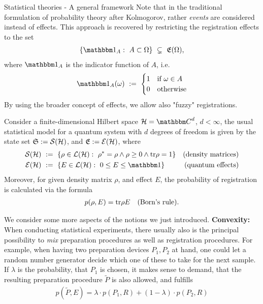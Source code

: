 \begin{section}{Statistical theories - A general framework}
Note that in the traditional formulation of probability theory after Kolmogorov, rather \emph{events} are considered instead of effects. This approach is recovered by restricting the registration effects to the set
\begin{align*}
\left\{\bbmeins_A: \ A \subset \Omega  \right\} \ \subsetneq \ \fE(\Omega),
\end{align*}
where $\bbmeins_A$ is the indicator function of $A$, i.e. 
\begin{align*}
  \bbmeins_A(\omega) \ := \ 
  \begin{cases}
	  1 	&\text{if} \ \omega \in A \\
	  0  	&\text{otherwise}
  \end{cases}
\end{align*}	
By using the broader concept of effects, we allow also "fuzzy" registrations. 
\begin{example}
Consider a finite-dimensional Hilbert space $\cH = \bbmC^d$, $d < \infty$, the usual statistical model for a quantum system with $d$ degrees of freedom is given by the state set ${\mathfrak S} := {\mathcal S}({\mathcal H})$, and ${\mathfrak E} := {\mathcal E}({\mathcal H})$, where 
\begin{align*}
	\cS(\cH) \
	&:= \ \{\rho \in \cL(\cH): \ \rho^\ast = \rho \wedge \rho \geq 0 \wedge \tr\rho = 1\} &\text{(density matrices)}\\
	\cE(\cH) \
	&:= \ \{E \in \cL(\cH): \ 0 \leq E \leq \bbmeins \} 
	&\text{(quantum effects)}
\end{align*} 
 Moreover, for given density matrix $\rho$, and effect $E$, the probability of registration is  calculated via the formula
 \begin{align*}
  p(\rho, E) = \mathrm{tr} \rho E &&\text{(Born's rule)}.
 \end{align*}
\end{example}
 We consider some more aspects of the notions we just introduced.  \newline 
\textbf{Convexity:} When conducting statistical experiments, there usually also is the principal possibility to \emph{mix} preparation procedures as well as registration procedures. For example, when having two preparation devices $P_1, P_2$ at hand, one could let a random number generator decide which one of these to take for the next sample. If $\lambda$ is the probability, that $P_1$ is chosen, it makes sense to demand, that the resulting preparation procedure $\tilde{P}$ is also allowed, and fulfills
 \begin{align}
	p(\tilde{P}, E) = \lambda \cdot p(P_1, R) + (1-\lambda) \cdot p(P_2,R) \label{mixture_of_preparations}

\end{align}
\end{section}

